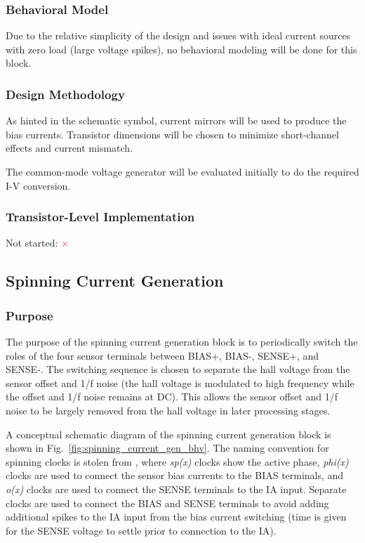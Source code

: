\documentclass{article}
\begin{document}
\subsubsection*{Behavioral Model}

Due to the relative simplicity of the design and issues with ideal current sources
with zero load (large voltage spikes), no behavioral modeling will be done for this block.

\subsubsection*{Design Methodology}

As hinted in the schematic symbol, current mirrors will be used to produce
the bias currents. Transistor dimensions will be chosen to minimize short-channel
effects and current mismatch.

The common-mode voltage generator will be evaluated initially to do the required I-V conversion.

\subsubsection*{Transistor-Level Implementation}

Not started: \textcolor{red}{$\times$}

\subsection{Spinning Current Generation}
\label{subsec:spinning_current_generation}

\subsubsection*{Purpose}

The purpose of the spinning current generation block is to periodically switch the roles
of the four sensor terminals between BIAS+, BIAS-, SENSE+, and SENSE-. The switching sequence is chosen to separate the hall voltage from
the sensor offset and 1/f noise (the hall voltage is modulated to high frequency while the offset and 1/f noise
remains at DC). This allows the sensor offset and 1/f noise to be largely removed from the hall voltage 
in later processing stages. 

A conceptual schematic diagram of the spinning current generation block is shown 
in Fig.~\ref{fig:spinning_current_gen_bhv}. The naming convention for spinning clocks
is stolen from \cite{Jiang2019CMOSWideBandwidth}, where \textit{sp(x)} clocks show the active phase, 
\textit{phi(x)} clocks are used to connect the sensor bias currents to the BIAS terminals,
and \textit{o(x)} clocks are used to connect the SENSE terminals to the IA input.
Separate clocks are used to connect the BIAS and SENSE terminals to avoid adding additional 
spikes to the IA input from the bias current switching 
(time is given for the SENSE voltage to settle prior to connection to the IA). 
\end{document}

